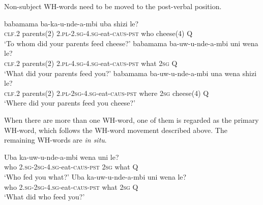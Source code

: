 \documentclass[12pt, oneside]{article}
\let\ipa\textipa
\begin{document}
Non-subject WH-words need to be moved to the post-verbal position.

\begin{exe}
\ex
{} babamama ba-ka-u-nde-\ipa{\textbeltl}a-mbi uba shizi le? \\
\textsc{clf.2} parents(2) \textsc{2.pl}-\textsc{2.sg}-\textsc{4.sg}-eat-\textsc{caus}-\textsc{pst} who cheese(4) Q \\
\trans `To whom did your parents feed cheese?'
\ex
{} babamama ba-uw-u-nde-\ipa{\textbeltl}a-mbi uni wena le? \\
\textsc{clf.2} parents(2) \textsc{2.pl}-\textsc{4.sg}-\textsc{4.sg}-eat-\textsc{caus}-\textsc{pst} what \textsc{2sg} Q \\
\trans `What did your parents feed you?'
\ex
{} babamama ba-uw-u-nde-\ipa{\textbeltl}a-mbi una wena shizi le? \\
\textsc{clf.2} parents(2) \textsc{2.pl}-\textsc{2sg}-\textsc{4.sg}-eat-\textsc{caus}-\textsc{pst} where \textsc{2sg} cheese(4) Q \\
\trans `Where did your parents feed you cheese?'
\end{exe}

When there are more than one WH-word, one of them is regarded as the primary WH-word, which follows the WH-word movement described above. The remaining WH-words are \textit{in situ}.

\begin{exe}
\ex
\begin{xlist}
\ex
\gll Uba ka-uw-u-nde-\ipa{\textbeltl}a-mbi wena uni le? \\
who \textsc{2.sg}-\textsc{2sg}-\textsc{4.sg}-eat-\textsc{caus}-\textsc{pst} \textsc{2sg} what Q \\
\trans `Who fed you what?'
\ex
\gll Uba ka-uw-u-nde-\ipa{\textbeltl}a-mbi uni wena le? \\
who \textsc{2.sg}-\textsc{2sg}-\textsc{4.sg}-eat-\textsc{caus}-\textsc{pst} what \textsc{2sg} Q \\
\trans `What did who feed you?'
\end{xlist}
\end{exe}
\end{document}

